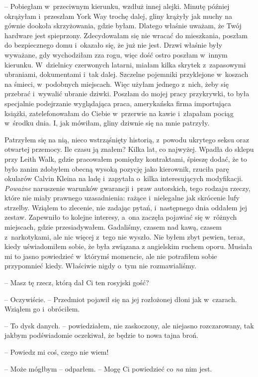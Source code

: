\documentclass[oneside,polish,12pt,sfheadings]{mwbk}
\begin{document}
-- Pobiegłam w~przeciwnym kierunku, wzdłuż innej alejki. Minutę później
okrążyłam i~przeszłam York Way trochę dalej, gliny krążyły jak muchy na
gównie dookoła skrzyżowania, gdzie byłam. Dlatego właśnie uważam, że
Twój hardware jest spieprzony. Zdecydowałam się nie wracać do
mieszkania, poszłam do bezpiecznego domu i~okazało się, że już nie jest.
Drzwi właśnie były wyważane, gdy wychodziłam zza rogu, więc dość ostro
poszłam w~innym kierunku. W~dzielnicy czerwonych latarni, miałam kilka
skrytek z~zapasowymi ubraniami, dokumentami i~tak dalej. Szczelne
pojemniki przyklejone w~koszach na śmieci, w~podobnych miejscach. Więc
użyłam jednego z~nich, żeby się przebrać i~wywalić ubranie dziwki.
Poszłam do mojej pracy przykrywki, to była specjalnie podejrzanie
wyglądająca praca, amerykańska firma importująca książki,
zatelefonowałam do Ciebie w~przerwie na kawie i~złapałam pociąg w~środku
dnia. I, jak mówiłam, gliny dziwnie się na mnie patrzyły.

Patrzyłem się na nią, nieco wstrząśnięty historią, z~powodu ukrytego
seksu oraz otwartej przemocy. Ile czasu ją znałem? Kilka lat, co
najwyżej. Wpadła do sklepu przy Leith Walk, gdzie pracowałem pomiędzy
kontraktami, śpieszę dodać, że to było zanim zdobyłem obecną wysoką
pozycję jako kierownik, rzuciła parę okularów Calvin Kleina na ladę i~zapytała o~kilka interesujących modyfikacji. \emph{Poważne} naruszenie
warunków gwarancji i~praw autorskich, tego rodzaju rzeczy, które nie
miały prawnego uzasadnienia: rażące i~nielegalne jak skrócenie lufy
strzelby. Wziąłem to zlecenie, nie zadając pytań, i~następnego dnia
oddałem jej zestaw. Zapewniło to kolejne interesy, a~ona zaczęła
pojawiać się w~różnych miejscach, gdzie przesiadywałem. Gadaliśmy,
czasem nad kawą, czasem z~narkotykami, ale nic więcej z~tego nie wyszło.
Nie byłem zbyt pewien, teraz, kiedy uświadomiłem sobie, że była związana
z angielskim ruchem oporu. Musiała mi to jasno powiedzieć w~którymś
momencie, ale nie potrafiłem sobie przypomnieć kiedy. Właściwie nigdy o~tym nie rozmawialiśmy.

-- Masz tę rzecz, którą dał Ci ten rosyjski gość?

-- Oczywiście. -- Przedmiot pojawił się na jej rozłożonej dłoni jak w~czarach. Wziąłem go i~obróciłem.

-- To dysk danych. -- powiedziałem, nie zaskoczony, ale niejasno
rozczarowany, tak jakbym podświadomie oczekiwał, że będzie to nowa tajna
broń.

-- Powiedz mi coś, czego nie wiem!

-- Może mógłbym -- odparłem. -- Mogę Ci powiedzieć co \emph{na} nim jest.
\end{document}

